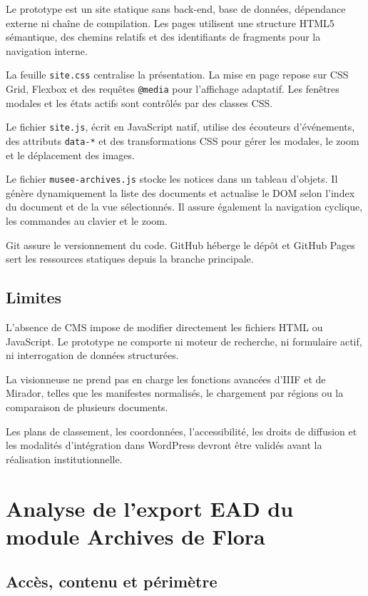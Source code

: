 Le prototype est un site statique sans back-end, base de données, dépendance externe ni chaîne de compilation. Les pages utilisent une structure HTML5 sémantique, des chemins relatifs et des identifiants de fragments pour la navigation interne.

La feuille \texttt{site.css} centralise la présentation. La mise en page repose sur CSS Grid, Flexbox et des requêtes \texttt{@media} pour l'affichage adaptatif. Les fenêtres modales et les états actifs sont contrôlés par des classes CSS.

Le fichier \texttt{site.js}, écrit en JavaScript natif, utilise des écouteurs d'événements, des attributs \texttt{data-*} et des transformations CSS pour gérer les modales, le zoom et le déplacement des images.

Le fichier \texttt{musee-archives.js} stocke les notices dans un tableau d'objets. Il génère dynamiquement la liste des documents et actualise le DOM selon l'index du document et de la vue sélectionnés. Il assure également la navigation cyclique, les commandes au clavier et le zoom.

Git assure le versionnement du code. GitHub héberge le dépôt et GitHub Pages sert les ressources statiques depuis la branche principale.

\subsection{Limites}

L'absence de CMS impose de modifier directement les fichiers HTML ou JavaScript. Le prototype ne comporte ni moteur de recherche, ni formulaire actif, ni interrogation de données structurées.

La visionneuse ne prend pas en charge les fonctions avancées d'IIIF et de Mirador, telles que les manifestes normalisés, le chargement par régions ou la comparaison de plusieurs documents.

Les plans de classement, les coordonnées, l'accessibilité, les droits de diffusion et les modalités d'intégration dans WordPress devront être validés avant la réalisation institutionnelle.

\clearpage
\section{Analyse de l'export EAD du module Archives de Flora}
\label{annexe:analyse-flora}

\subsection{Accès, contenu et périmètre}

